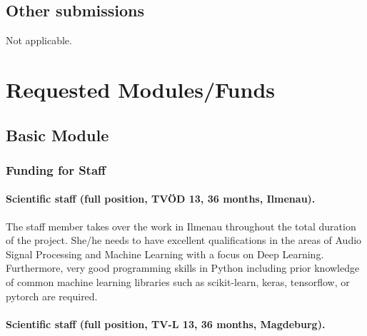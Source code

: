 \documentclass[11pt]{article}
\begin{document}
\subsection{Other submissions}
Not applicable.
\vspace{-.3cm}
\section{Requested Modules/Funds}

\subsection{Basic Module}

\subsubsection{Funding for Staff}

\paragraph{Scientific staff (full position, TVÖD 13, 36 months, Ilmenau).} 

The staff member takes over the work in Ilmenau throughout the total duration of the project. 
She/he needs to have excellent qualifications in the areas of Audio Signal Processing and Machine Learning with a focus on Deep Learning. Furthermore, very good programming skills in Python including prior knowledge of common machine learning libraries such as scikit-learn, keras, tensorflow, or pytorch are required.

\paragraph{Scientific staff (full position, TV-L 13, 36 months, Magdeburg).}
\end{document}
